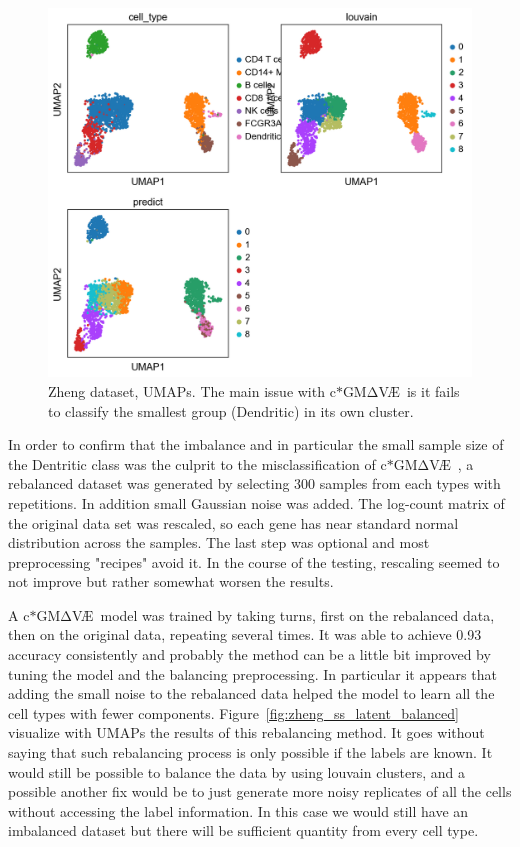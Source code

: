\documentclass[11pt, a4paper]{report}
\theoremstyle{plain}
\theoremstyle{definition}
\theoremstyle{remark}
\newcommand{\gmvae}{c$\ast$GM$\mathrm{\Delta}$V\AE~}
\begin{document}
\begin{figure}[h]
\centering
\includegraphics[width=1.1\textwidth]{images/gmmvae_zheng_us_9c_umap.png}
\caption{Zheng dataset, UMAPs. The main issue with \gmvae is it fails to 
classify the smallest group (Dendritic) in its own cluster.}
\label{fig:zheng_ss_latent}
\end{figure}

In order to confirm that the imbalance and in particular the small sample size
of the Dentritic class was the culprit to the misclassification of \gmvae, 
a 
rebalanced dataset was generated by selecting 
$300$ samples from each types with repetitions. In addition small
Gaussian noise was added.
The log-count matrix of the original data set was rescaled,
so each gene has near standard normal distribution across the samples.
The last step was optional and most preprocessing "recipes" avoid it.
In the course of the testing, rescaling seemed to not improve but rather
somewhat worsen the results.

A \gmvae model was trained by taking turns, first on the rebalanced data, then on
the original data, repeating several times.
It was  able to achieve 0.93 accuracy consistently and probably the method can
be a little bit improved by tuning the model and the balancing preprocessing.
In particular it appears that adding the small noise to the rebalanced data
helped the model to learn all the cell types with fewer components.
Figure~\ref{fig:zheng_ss_latent_balanced} visualize with UMAPs the results 
of this rebalancing method. It goes without saying that such rebalancing process
is only possible if the labels are known. It would still be possible to balance
the data by using louvain clusters, and a possible another fix would be to just
generate more noisy replicates of all the cells without accessing the label
information. In this case we would still have an imbalanced dataset but there will
be sufficient quantity from every cell type.
\end{document}
